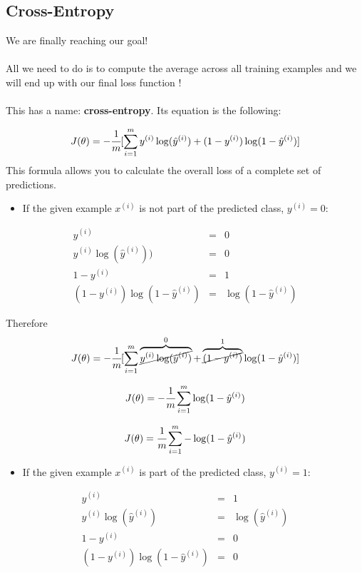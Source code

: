 \subsection*{Cross-Entropy}
We are finally reaching our goal!\\
\\
All we need to do is to compute the average across all training examples
 and we will end up with our final loss function !\\
\\
This has a name: \textbf{cross-entropy}. Its equation is the following:  

$$
J( \theta) = -\cfrac{1} {m} \lbrack \sum_{i = 1}^{m} y^{(i)}\log(\hat{y}^{(i)}) + (1 - y^{(i)})\log(1 - \hat{y}^{(i)})\rbrack
$$
This formula allows you to calculate the overall loss of a complete set of predictions.\\
\newpage
{}
\begin{itemize}
    \item If the given example $x^{(i)}$ is not part of the predicted class, $y^{(i)} = 0$:
\end{itemize}
$$
\begin{matrix}
y^{(i)} & = & 0 \\
y^{(i)}\log(\hat{y}^{(i)})) & = & 0   \\
1 - y^{(i)} & = & 1 \\
(1 - y^{(i)})\log(1 - \hat{y}^{(i)}) & = & \log(1 - \hat{y}^{(i)})
\end{matrix}
$$

Therefore
$$
J( \theta) = -\cfrac{1} {m} \lbrack \sum_{i = 1}^{m} \overbrace{\cancel{y^{(i)}\log(\hat{y}^{(i)})}}^{0} + \overbrace{\cancel{(1 - y^{(i)})}}^{1}\log(1 - \hat{y}^{(i)})\rbrack
$$

$$
J( \theta) = -\cfrac{1} {m} \sum_{i = 1}^{m} \log(1 - \hat{y}^{(i)})
$$

$$
J( \theta) = \cfrac{1} {m} \sum_{i = 1}^{m} -\log(1 - \hat{y}^{(i)})
$$

\begin{itemize}
    \item If the given example $x^{(i)}$ is part of the predicted class, $y^{(i)} = 1$:
\end{itemize}

$$
\begin{matrix}
y^{(i)} & = & 1 \\
y^{(i)}\log(\hat{y}^{(i)}) & = & \log(\hat{y}^{(i)})\\
1 - y^{(i)} & = & 0 \\ 
(1 - y^{(i)})\log(1 - \hat{y}^{(i)}) & = & 0  
\end{matrix}
$$

